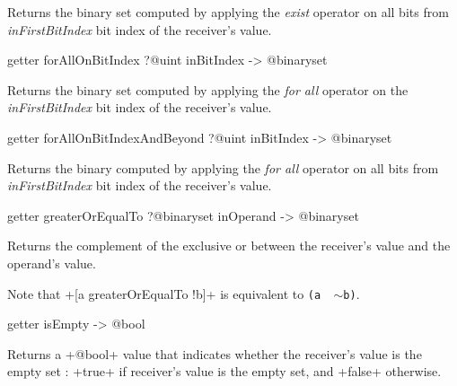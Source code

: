 Returns the binary set computed by applying the \emph{exist} operator on all bits from \emph{inFirstBitIndex} bit index of the receiver's value.








\begin{galgas3box}
getter forAllOnBitIndex ?@uint inBitIndex -> @binaryset
\end{galgas3box}

Returns the binary set computed by applying the \emph{for all} operator on the \emph{inFirstBitIndex} bit index of the receiver's value.








\begin{galgas3box}
getter forAllOnBitIndexAndBeyond ?@uint inBitIndex -> @binaryset
\end{galgas3box}


Returns the binary computed by applying the \emph{for all} operator on all bits from \emph{inFirstBitIndex} bit index of the receiver's value.









\begin{galgas3box}
getter greaterOrEqualTo ?@binaryset inOperand -> @binaryset
\end{galgas3box}


Returns the complement of the exclusive or between the receiver's value and the operand's value.

Note that \ggst+[a greaterOrEqualTo !b]+ is equivalent to \texttt{(a \textbar ~$\sim$b)}.









\begin{galgas3box}
getter isEmpty -> @bool
\end{galgas3box}

Returns a \ggst+@bool+ value that indicates whether the receiver's value is the empty set :  \ggst+true+ if receiver's value is the empty set, and \ggst+false+ otherwise.







